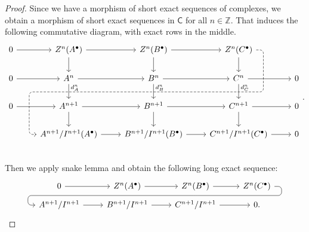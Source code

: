 \documentclass[../Main]{subfiles}
\begin{document}
\begin{proof}
	Since we have a morphism of short exact sequences of complexes,
	we obtain a morphism of short exact sequences in $\mathsf{C}$ for all $n \in \mathbb{Z}$.
	That induces the following commutative diagram, with exact rows in the middle.
	\begin{equation}
	\begin{tikzcd}
		0 \arrow[r, "", rightarrow] &
		Z^n (A^\bullet) \arrow[r, "", rightarrow] \arrow[d, "", rightarrow] &
		Z^n (B^\bullet) \arrow[r, "", rightarrow] \arrow[d, "", rightarrow] 
		\arrow[ddd, phantom, ""{coordinate, name=Z}] &
		Z^n (C^\bullet) \arrow[d, "", rightarrow] 
		\arrow[dddll, "", dashed, rounded corners, bend left = 100,
		to path={ -- ([xshift=2ex]\tikztostart.east)
			|- (Z) [near end]\tikztonodes
			-| ([xshift=-2ex]\tikztotarget.west)
			-- (\tikztotarget)}] & \\
		0 \arrow[r, "", rightarrow] &
		A^n \arrow[r, "", rightarrow] \arrow[d, "d^n_A" near start, rightarrow] &
		B^n \arrow[r, "", rightarrow] \arrow[d, "d^n_B", near start, rightarrow] &
		C^n \arrow[r, "", rightarrow] \arrow[d, "d^n_C", near start, rightarrow] &
		0\\
		0 \arrow[r, "", rightarrow] &
		A^{n+1} \arrow[r, "", rightarrow] \arrow[d, "", rightarrow] &
		B^{n+1} \arrow[r, "", rightarrow] \arrow[d, "", rightarrow] &
		C^{n+1} \arrow[r, "", rightarrow] \arrow[d, "", rightarrow] &
		0\\
		&
		A^{n+1}/I^{n+1}(A^\bullet) \arrow[r, "", rightarrow] &
		B^{n+1}/I^{n+1}(B^\bullet) \arrow[r, "", rightarrow] &
		C^{n+1}/I^{n+1}(C^\bullet) \arrow[r, "", rightarrow] &
		0\\
	\end{tikzcd}
	.\end{equation} 
	Then we apply snake lemma and obtain the following long exact sequence:
	\begin{equation}
	\begin{tikzcd}[row sep=tiny]
		0 \arrow[r, "", rightarrow] &
		Z^n(A^\bullet) \arrow[r, "", rightarrow] &
		Z^n(B^\bullet) \arrow[r, "", rightarrow]
		\arrow[d, phantom, ""{coordinate, name=Z}] &
		Z^n(C^\bullet) 
		\arrow[dlll, "", rounded corners, bend left = 100,
		to path={ -- ([xshift=2ex]\tikztostart.east)
			|- (Z) [near end]\tikztonodes
			-| ([xshift=-2ex]\tikztotarget.west)
			-- (\tikztotarget)}] \\
		A^{n+1}/I^{n+1} \arrow[r, "", rightarrow] &
		B^{n+1}/I^{n+1} \arrow[r, "", rightarrow] &
		C^{n+1}/I^{n+1} \arrow[r, "", rightarrow] &
		0.
	\end{tikzcd}

\end{equation}
\end{proof}
\end{document}
